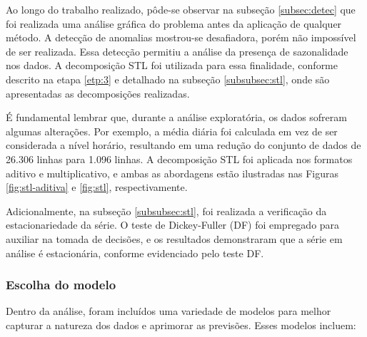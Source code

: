 Ao longo do trabalho realizado, pôde-se observar na subseção \ref{subsec:detec} que foi realizada uma análise gráfica do problema antes da aplicação de qualquer método. A detecção de anomalias mostrou-se desafiadora, porém não impossível de ser realizada. Essa detecção permitiu a análise da presença de sazonalidade nos dados. A decomposição STL foi utilizada para essa finalidade, conforme descrito na etapa \ref{etp:3} e detalhado na subseção \ref{subsubsec:stl}, onde são apresentadas as decomposições realizadas.

É fundamental lembrar que, durante a análise exploratória, os dados sofreram algumas alterações. Por exemplo, a média diária foi calculada em vez de ser considerada a nível horário, resultando em uma redução do conjunto de dados de 26.306 linhas para 1.096 linhas. A decomposição STL foi aplicada nos formatos aditivo e multiplicativo, e ambas as abordagens estão ilustradas nas Figuras \ref{fig:stl-aditiva} e \ref{fig:stl}, respectivamente.

Adicionalmente, na subseção \ref{subsubsec:stl}, foi realizada a verificação da estacionariedade da série. O teste de Dickey-Fuller (DF) foi empregado para auxiliar na tomada de decisões, e os resultados demonstraram que a série em análise é estacionária, conforme evidenciado pelo teste DF.



\subsubsection{Escolha do modelo}



Dentro da análise, foram incluídos uma variedade de modelos para melhor capturar a natureza dos dados e aprimorar as previsões. Esses modelos incluem:

